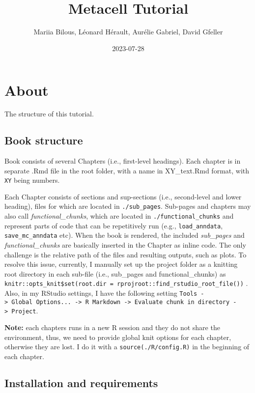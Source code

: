 \documentclass[
]{book}
\title{Metacell Tutorial}
\author{Mariia Bilous, Léonard Hérault, Aurélie Gabriel, David Gfeller}
\date{2023-07-28}
\begin{document}
\maketitle

{
\setcounter{tocdepth}{1}
\tableofcontents
}
\hypertarget{about}{%
\chapter{About}\label{about}}

The structure of this tutorial.

\hypertarget{book-structure}{%
\section{Book structure}\label{book-structure}}

Book consists of several Chapters (i.e., first-level headings). Each chapter is in separate .Rmd file in the root folder, with a name in XY\_text.Rmd format, with \texttt{XY} being numbers.

Each Chapter consists of sections and sup-sections (i.e., second-level and lower heading), files for which are located in \texttt{./sub\_pages}. Sub-pages and chapters may also call \emph{functional\_chunks}, which are located in \texttt{./functional\_chunks} and represent parts of code that can be repetitively run (e.g., \texttt{load\_anndata}, \texttt{save\_mc\_anndata} etc). When the book is rendered, the included \emph{sub\_pages} and \emph{functional\_chunks} are basically inserted in the Chapter as inline code. The only challenge is the relative path of the files and resulting outputs, such as plots. To resolve this issue, currently, I manually set up the project folder as a knitting root directory in each sub-file (i.e., sub\_pages and functional\_chunks) as \texttt{knitr::opts\_knit\$set(root.dir\ =\ rprojroot::find\_rstudio\_root\_file())} . Also, in my RStudio settings, I have the following setting \texttt{Tools\ -\textgreater{}\ Global\ Options...\ -\textgreater{}\ R\ Markdown\ -\textgreater{}\ Evaluate\ chunk\ in\ directory\ -\textgreater{}\ Project}.

\textbf{Note:} each chapters runs in a new R session and they do not share the environment, thus, we need to provide global knit options for each chapter, otherwise they are lost. I do it with a \texttt{source(\textquotesingle{}./R/config.R\textquotesingle{})} in the beginning of each chapter.

\hypertarget{installation-and-requirements}{%
\section{Installation and requirements}\label{installation-and-requirements}}
\end{document}
